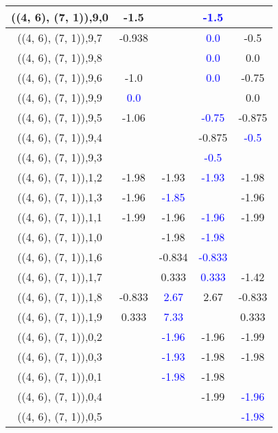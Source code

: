 \documentclass{article}
\begin{document}
\begin{center}
\begin{longtable}{|c|c|c|c|c|}
        	\hline
        	((4, 6), (7, 1)),9,0&-1.5&& \textcolor{blue}{-1.5}&\\
        	\hline
        	((4, 6), (7, 1)),9,7&-0.938&& \textcolor{blue}{0.0}&-0.5\\
        	\hline
        	((4, 6), (7, 1)),9,8&&& \textcolor{blue}{0.0}&0.0\\
        	\hline
        	((4, 6), (7, 1)),9,6&-1.0&& \textcolor{blue}{0.0}&-0.75\\
        	\hline
        	((4, 6), (7, 1)),9,9& \textcolor{blue}{0.0}&&&0.0\\
        	\hline
        	((4, 6), (7, 1)),9,5&-1.06&& \textcolor{blue}{-0.75}&-0.875\\
        	\hline
        	((4, 6), (7, 1)),9,4&&&-0.875& \textcolor{blue}{-0.5}\\
        	\hline
        	((4, 6), (7, 1)),9,3&&& \textcolor{blue}{-0.5}&\\
        	\hline
        	((4, 6), (7, 1)),1,2&-1.98&-1.93& \textcolor{blue}{-1.93}&-1.98\\
        	\hline
        	((4, 6), (7, 1)),1,3&-1.96& \textcolor{blue}{-1.85}&&-1.96\\
        	\hline
        	((4, 6), (7, 1)),1,1&-1.99&-1.96& \textcolor{blue}{-1.96}&-1.99\\
        	\hline
        	((4, 6), (7, 1)),1,0&&-1.98& \textcolor{blue}{-1.98}&\\
        	\hline
        	((4, 6), (7, 1)),1,6&&-0.834& \textcolor{blue}{-0.833}&\\
        	\hline
        	((4, 6), (7, 1)),1,7&&0.333& \textcolor{blue}{0.333}&-1.42\\
        	\hline
        	((4, 6), (7, 1)),1,8&-0.833& \textcolor{blue}{2.67}&2.67&-0.833\\
        	\hline
        	((4, 6), (7, 1)),1,9&0.333& \textcolor{blue}{7.33}&&0.333\\
        	\hline
        	((4, 6), (7, 1)),0,2&& \textcolor{blue}{-1.96}&-1.96&-1.99\\
        	\hline
        	((4, 6), (7, 1)),0,3&& \textcolor{blue}{-1.93}&-1.98&-1.98\\
        	\hline
        	((4, 6), (7, 1)),0,1&& \textcolor{blue}{-1.98}&-1.98&\\
        	\hline
        	((4, 6), (7, 1)),0,4&&&-1.99& \textcolor{blue}{-1.96}\\
        	\hline
        	((4, 6), (7, 1)),0,5&&&& \textcolor{blue}{-1.98}\\
        	\hline

\end{longtable}
\end{center}
\end{document}
